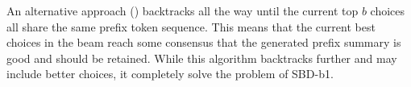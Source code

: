 An alternative approach (\DIFdelbegin {}\DIFdelend \DIFaddbegin \textbf{}\DIFaddend ) backtracks all the way until the current
top $b$ choices all share the same prefix token sequence. This means
that the current best choices in the beam reach some consensus that
the generated prefix summary is good and should be retained. 
While this algorithm backtracks further and may
include better choices, it \DIFdelbegin {}\DIFdelend \DIFaddbegin {}\DIFaddend completely solve the problem of SBD-b1. 
\DIFaddbegin {}

